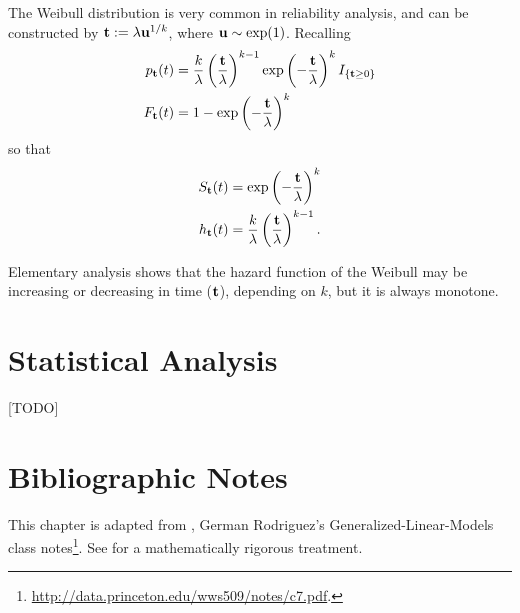 \begin{example}
The Weibull distribution is very common in reliability analysis, and can be constructed by 
$\mathbf{t} := \lambda \mathbf{u}^{1/k}$, where $\mathbf{u} \sim \exp(1)$. 
Recalling
\begin{align}
	p_{\mathbf{t}} (t) &= \frac{k}{\lambda}\left(\frac{\mathbf{t}}{\lambda} \right)^{k-1} \exp\left(-\frac{\mathbf{t}}{\lambda} \right)^k  I_{\{ \mathbf{t}\geq 0 \}} \\
	F_{\mathbf{t}} (t) &= 1 - \exp \left(-\frac{\mathbf{t}}{\lambda} \right)^k 
\end{align}
so that 
\begin{align}
	S_{\mathbf{t}} (t) &= \exp \left(-\frac{\mathbf{t}}{\lambda} \right)^k \\
	h_{\mathbf{t}} (t) &= \frac{k}{\lambda} \left(\frac{\mathbf{t}}{\lambda} \right)^{k-1} .
\end{align}
\end{example}
Elementary analysis shows that the hazard function of the Weibull may be increasing or decreasing in time ($\mathbf{t}$), depending on $k$, but it is always monotone.








\section{Statistical Analysis}
[TODO]


\section{Bibliographic Notes}
This chapter is adapted from \cite[Ch.8]{natrella_nist/sematech_2010}, German Rodriguez's Generalized-Linear-Models class notes\footnote{\url{http://data.princeton.edu/wws509/notes/c7.pdf}.}.
See \cite{aven_stochastic_1999} for a mathematically rigorous treatment.

